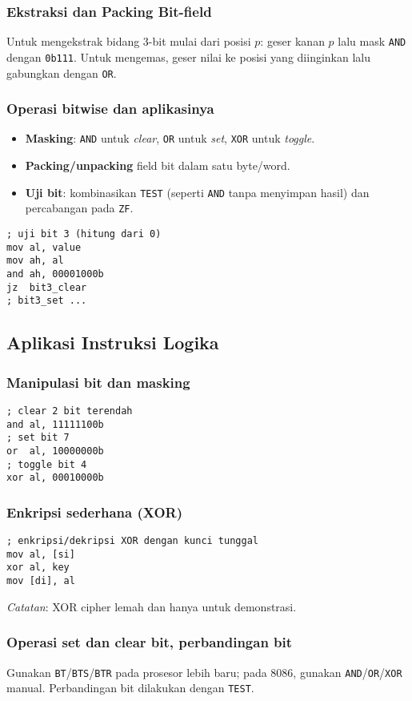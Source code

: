 \subsubsection{Ekstraksi dan Packing Bit-field}
Untuk mengekstrak bidang 3-bit mulai dari posisi \(p\): geser kanan \(p\) lalu mask \texttt{AND} dengan \texttt{0b111}. Untuk mengemas, geser nilai ke posisi yang diinginkan lalu gabungkan dengan \texttt{OR}. 
\subsubsection{Operasi bitwise dan aplikasinya}
\begin{itemize}
  \item \textbf{Masking}: \texttt{AND} untuk \textit{clear}, \texttt{OR} untuk \textit{set}, \texttt{XOR} untuk \textit{toggle}.
  \item \textbf{Packing/unpacking} field bit dalam satu byte/word.
  \item \textbf{Uji bit}: kombinasikan \texttt{TEST} (seperti \texttt{AND} tanpa menyimpan hasil) dan percabangan pada \texttt{ZF}.
\end{itemize}
\begin{verbatim}
; uji bit 3 (hitung dari 0)
mov al, value
mov ah, al
and ah, 00001000b
jz  bit3_clear
; bit3_set ...
\end{verbatim}

\subsection{Aplikasi Instruksi Logika}
\subsubsection{Manipulasi bit dan masking}
\begin{verbatim}
; clear 2 bit terendah
and al, 11111100b
; set bit 7
or  al, 10000000b
; toggle bit 4
xor al, 00010000b
\end{verbatim}

\subsubsection{Enkripsi sederhana (XOR)}
\begin{verbatim}
; enkripsi/dekripsi XOR dengan kunci tunggal
mov al, [si]
xor al, key
mov [di], al
\end{verbatim}
\textit{Catatan}: XOR cipher lemah dan hanya untuk demonstrasi.

\subsubsection{Operasi set dan clear bit, perbandingan bit}
Gunakan \texttt{BT}/\texttt{BTS}/\texttt{BTR} pada prosesor lebih baru; pada 8086, gunakan \texttt{AND}/\texttt{OR}/\texttt{XOR} manual. Perbandingan bit dilakukan dengan \texttt{TEST}.

